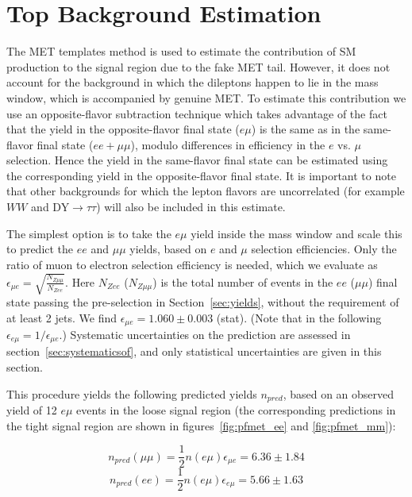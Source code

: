 


\section{Top Background Estimation}
\label{sec:topbkg}


The MET templates method is used to estimate the contribution of SM \Z production
 to the signal region due to the fake MET tail. However,
it does not account for the \ttbar background in which the dileptons happen to lie
 in the \Z mass window, which is accompanied by genuine MET. 
To estimate this contribution we use an opposite-flavor subtraction
technique which takes advantage of the fact that the \ttbar yield in the 
opposite-flavor final state ($e\mu$) is the same as in the same-flavor final state
($ee+\mu\mu$), modulo differences in efficiency in the $e$ vs. $\mu$ selection.
 Hence the \ttbar yield in the same-flavor final state can be estimated
using the corresponding yield in the opposite-flavor final state. 
It is important to note that other backgrounds for which the lepton flavors are
uncorrelated (for example $WW$ and DY$\rightarrow \tau\tau$) will also be included in
this estimate.

The simplest option
 is to take the $e\mu$ yield inside the \Z mass window and scale this
to predict the $ee$ and $\mu\mu$ yields, based on $e$ and $\mu$ selection efficiencies.
Only the ratio of muon to electron selection efficiency is needed, which we evaluate
 as $\epsilon_{\mu e} = \sqrt{\frac{N_{Z\mu\mu}}{N_{Zee}}}$. 
Here $N_{Zee}$ ($N_{Z\mu\mu}$) is the total number of events in the $ee$ ($\mu\mu$)
 final state passing the pre-selection in Section~\ref{sec:yields},
without the requirement of at least 2 jets. We find
 $\epsilon_{\mu e}=1.060 \pm 0.003$ (stat). %
(Note that in the following $\epsilon_{e\mu} = 1/\epsilon_{\mu e}$.)
Systematic uncertainties on the prediction are assessed in section~\ref{sec:systematicsof}, 
and only statistical uncertainties are given in this section.

This procedure yields the following predicted yields $n_{pred}$,
based on an observed yield of 12 $e\mu$ events %
in the loose signal region (the corresponding predictions in the tight 
signal region are shown in figures~\ref{fig:pfmet_ee} and \ref{fig:pfmet_mm}): 

\begin{equation}
n_{pred}(\mu\mu) = \frac{1}{2}n(e\mu)\epsilon_{\mu e} = 6.36 \pm 1.84 %
\end{equation}
\begin{equation}
n_{pred}(ee)     = \frac{1}{2}n(e\mu)\epsilon_{e\mu} = 5.66 \pm 1.63
\end{equation}

